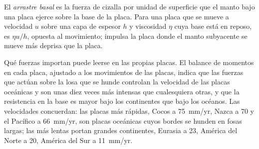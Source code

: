 \begin{omfigure}

\par{}\label{fig:b3:mantle-convection:ridge-push}
\end{omfigure}

\begin{definition}\label{def:b3:mantle-convection:basal-drag}
El \emph{arrastre basal} es la fuerza de cizalla por unidad de superficie que el
manto bajo una placa ejerce sobre la base de la placa. Para una placa que se mueve a velocidad $u$
sobre una capa de espesor $h$ y viscosidad $\eta$ cuya base está en reposo, es
$\eta u/h$, opuesta al movimiento; impulsa la placa donde el manto subyacente
se mueve más deprisa que la placa.
\end{definition}

Qué fuerzas importan puede leerse en las propias placas. El balance de momentos
en cada placa, ajustado a los movimientos de las placas, indica que las fuerzas que actúan sobre la
losa que se hunde controlan la velocidad de las placas oceánicas y son unas diez veces
más intensas que cualesquiera otras, y que la resistencia en la base es mayor bajo los
continentes que bajo los océanos. Las velocidades concuerdan: las placas más rápidas, Cocos a
\qty{75}{mm/yr}, Nazca a 70 y el Pacífico a \qty{66}{mm/yr}, son placas oceánicas
cuyos bordes se hunden en fosas largas; las más lentas portan grandes continentes,
Eurasia a 23, América del Norte a 20, América del Sur a \qty{11}{mm/yr}.

